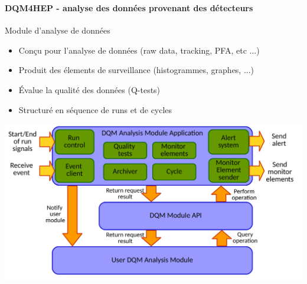 \documentclass[8pt]{beamer}
\begin{document}
    \begin{frame}
    \frametitle{\backup}
    \framesubtitle{DQM4HEP - analyse des données provenant des détecteurs}
      \begin{minipage}{0.78\textwidth}
        \begin{block}{Module d'analyse de données}
          \begin{itemize}
            \item Conçu pour l'analyse de données (raw data, tracking, PFA, etc ...)
            \item Produit des élements de surveillance (histogrammes, graphes, ...)
            \item Évalue la qualité des données (Q-tests)
            \item Structuré en séquence de runs et de cycles
          \end{itemize}
        \end{block}
        \begin{center}
          \includegraphics[width=\linewidth]{AnalysisModuleApplicationDiagram.pdf}
        \end{center}
      \end{minipage} \hfill
      \begin{minipage}{0.18\textwidth}
        \begin{flushright}
\end{flushright}
\end{minipage}
\end{frame}
\end{document}
